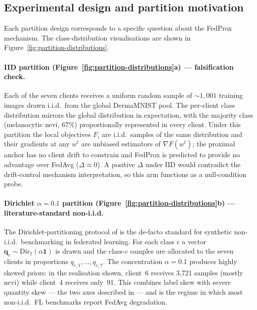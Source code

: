 \subsection{Experimental design and partition motivation}
\label{sec:partition-designs}

Each partition design corresponds to a specific question about the
FedProx mechanism. The class-distribution visualisations are shown
in Figure~\ref{fig:partition-distributions}.

\paragraph{IID partition (Figure~\ref{fig:partition-distributions}a) ---
falsification check.}
Each of the seven clients receives a uniform random sample of $\sim
1{,}001$ training images drawn i.i.d.\ from the global DermaMNIST
pool. The per-client class distribution mirrors the global
distribution in expectation, with the majority class (melanocytic
nevi, 67\%) proportionally represented in every client. Under this
partition the local objectives $F_i$ are i.i.d.\ samples of the same
distribution and their gradients at any $w^t$ are unbiased estimators
of $\nabla F(w^t)$; the proximal anchor has no client drift to
constrain and FedProx is predicted to provide no advantage over
FedAvg ($\Delta \approx 0$). A positive $\Delta$ under IID would
contradict the drift-control mechanism interpretation, so this arm
functions as a null-condition probe.

\paragraph{Dirichlet $\alpha = 0.1$ partition
(Figure~\ref{fig:partition-distributions}b) --- literature-standard
non-i.i.d.}
The Dirichlet-partitioning protocol of \citet{hsu2019dirichlet} is
the de-facto standard for synthetic non-i.i.d.\ benchmarking in
federated learning. For each class $c$ a vector
$\bm{q}_c \sim \mathrm{Dir}_7(\alpha \bm{1})$ is drawn and the
class-$c$ samples are allocated to the seven clients in proportions
$q_{c,1}, \dots, q_{c,7}$. The concentration $\alpha = 0.1$ produces
highly skewed priors: in the realisation shown, client~6 receives
3{,}721 samples (mostly nevi) while client~4 receives only~91. This
combines label skew with severe quantity skew --- the two axes
described in \citet{kairouz2021advances} --- and is the regime in
which most non-i.i.d.\ FL benchmarks report FedAvg degradation.

